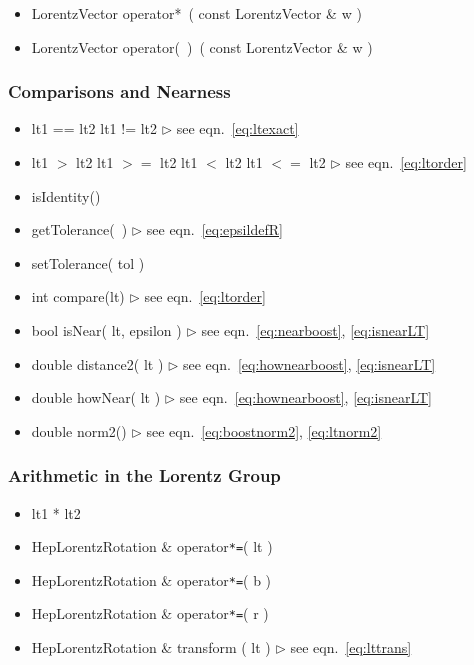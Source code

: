 \documentclass[twoside,12pt]{article}
\newcommand {\see}[1] {\hfill$\triangleright$ see eqn.~#1}
\newenvironment{shortlist}{%
\begin{itemize}
\setlength{\itemsep}{0pt}
\setlength{\parskip}{0pt}
}{%
\end{itemize}
}
\begin{document}
\begin{shortlist}
  \item LorentzVector operator*~( const LorentzVector \& w ) 
  \item LorentzVector operator(~)~( const LorentzVector \& w ) 
\end{shortlist}

\subsubsection{Comparisons and Nearness}

\begin{shortlist}
  \item lt1 == lt2 \/\/\/ lt1 != lt2 		\see{\ref{eq:ltexact}}
  \item lt1 $>$ lt2 \/\/\/ lt1 $>=$ lt2 \/\/\/ lt1 $<$ lt2 \/\/\/ lt1 $<=$ lt2
						\see{\ref{eq:ltorder}}
  \item isIdentity()
\end{shortlist}


\begin{shortlist}
  \item getTolerance(~)	\see{\ref{eq:epsildefR}}
  \item setTolerance( tol )
  \item int compare(lt)				\see{\ref{eq:ltorder}}
  \item bool isNear( lt, epsilon )		\see{\ref{eq:nearboost},
						     \ref{eq:isnearLT}}
  \item double distance2( lt ) 			\see{\ref{eq:hownearboost}, 
						     \ref{eq:isnearLT}}
  \item double howNear( lt ) 			\see{\ref{eq:hownearboost}, 
						     \ref{eq:isnearLT}}
  \item double norm2()				\see{\ref{eq:boostnorm2},
						     \ref{eq:ltnorm2}}
\end{shortlist}

\subsubsection{Arithmetic in the Lorentz Group}

\begin{shortlist}
  \item lt1 * lt2
  \item HepLorentzRotation \& operator\verb$*=$( lt )
  \item HepLorentzRotation \& operator\verb$*=$( b )
  \item HepLorentzRotation \& operator\verb$*=$( r )
  \item HepLorentzRotation \& transform ( lt )  	\see{\ref{eq:lttrans}}
\end{shortlist}
\end{document}
